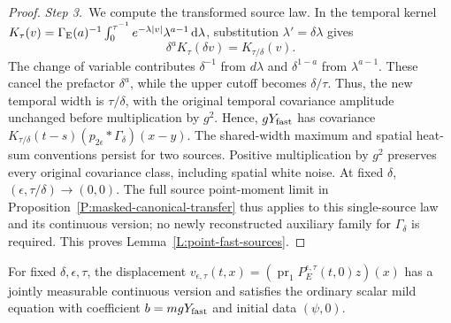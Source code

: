 \begin{proof}
  \medskip
  \noindent\textit{Step 3.~}We compute the transformed source law.
  In the temporal kernel $K_\tau(v) = \Gamma_{\rm E}(a)^{-1}
  \int_0^{\tau^{-1}}e^{-\lambda|v|}\lambda^{a-1}\,\mathrm{d}\lambda$, substitution
  $\lambda' = \delta\lambda$ gives
  \[
    \delta^aK_\tau(\delta v)=K_{\tau/\delta}(v).
  \]
  The change of variable contributes $\delta^{-1}$ from $d\lambda$ and
  $\delta^{1-a}$ from $\lambda^{a-1}$. These cancel the prefactor $\delta^a$,
  while the upper cutoff becomes $\delta/\tau$. Thus, the new temporal width
  is $\tau/\delta$, with the original temporal covariance amplitude unchanged
  before multiplication by $g^2$.
  Hence, $gY_{\rm fast}$ has covariance
  $K_{\tau/\delta}(t-s)(p_{2\epsilon}*\Gamma_\delta)(x-y)$. The shared-width
  maximum and spatial heat-sum conventions persist for two sources. Positive
  multiplication by $g^2$ preserves every original covariance class, including
  spatial white noise. At fixed $\delta$, $(\epsilon,\tau/\delta) \to (0,0)$.
  The full source point-moment limit in
  Proposition~\ref{P:masked-canonical-transfer} thus applies to this
  single-source law and its continuous version; no newly reconstructed auxiliary
  family for $\Gamma_\delta$ is required. This proves
  Lemma~\ref{L:point-fast-sources}.
\end{proof}

\begin{lemma}\label{L:point-compact-source}
  For fixed $\delta,\epsilon,\tau$, the displacement $v_{\epsilon,\tau}(t,x) =
  (\operatorname{pr}_1P_E^{\epsilon,\tau}(t,0)z)(x)$ has a jointly measurable
  continuous version and satisfies the ordinary scalar mild equation with
  coefficient $b = mgY_{\rm fast}$ and initial data $(\psi,0)$.
\end{lemma}

